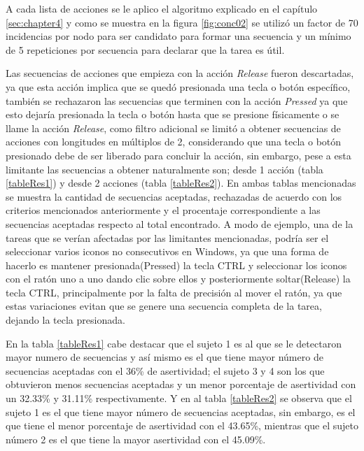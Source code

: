 A cada lista de acciones se le aplico el algoritmo explicado en el cap\'itulo 
 \ref{sec:chapter4} y como se muestra en la figura \ref{fig:conc02} se 
 utiliz\'o un factor de 70 incidencias por nodo para ser candidato para formar 
 una secuencia y un m\'inimo de 5 repeticiones por secuencia para declarar que 
 la tarea es \'util. 


Las secuencias de acciones que empieza con la acci\'on \emph{Release} fueron 
 descartadas, ya que esta acci\'on implica que se qued\'o presionada una tecla 
 o bot\'on espec\'ifico, tambi\'en se rechazaron las secuencias que terminen 
 con la acci\'on \emph{Pressed} ya que esto dejar\'ia presionada la tecla o 
 bot\'on hasta que se presione f\'isicamente o se llame la acci\'on 
 \emph{Release}, como filtro adicional se limit\'o a obtener secuencias de 
 acciones con longitudes en m\'ultiplos de 2, considerando que una tecla o 
 bot\'on presionado debe de ser liberado para concluir la acci\'on, sin 
 embargo, pese a esta limitante las secuencias a obtener naturalmente son; 
 desde 1 acci\'on (tabla \ref{tableRes1}) y desde 2 acciones (tabla 
 \ref{tableRes2}). En ambas tablas mencionadas se muestra la cantidad de 
 secuencias aceptadas, rechazadas de acuerdo con los criterios mencionados 
 anteriormente y el procentaje correspondiente a las secuencias aceptadas 
 respecto al total encontrado. A modo de ejemplo, una de la tareas que se 
 ver\'ian afectadas por las limitantes mencionadas, podr\'ia ser el 
 seleccionar varios iconos no consecutivos en Windows, ya que una forma de 
 hacerlo es mantener presionada(Pressed) la tecla CTRL y seleccionar los 
 iconos con el rat\'on uno a uno dando clic sobre ellos y posteriormente 
 soltar(Release) la tecla CTRL, principalmente por la falta de precisi\'on al 
 mover el rat\'on, ya que estas variaciones evitan que se genere una secuencia 
 completa de la tarea, dejando la tecla presionada.


En la tabla \ref{tableRes1} cabe destacar que el sujeto 1 es al que se le 
 detectaron mayor numero de secuencias y as\'i mismo es el que tiene mayor 
 n\'umero de secuencias aceptadas con el 36\% de asertividad; el sujeto 3 y 4 
 son los que obtuvieron menos secuencias aceptadas y un menor porcentaje de 
 asertividad con un 32.33\% y 31.11\% respectivamente. Y en al tabla 
 \ref{tableRes2} se observa que el sujeto 1 es el que tiene mayor n\'umero de 
 secuencias aceptadas, sin embargo, es el que tiene el menor porcentaje de 
 asertividad con el 43.65\%, mientras que el sujeto n\'umero 2 es el que tiene 
 la mayor asertividad con el 45.09\%.


